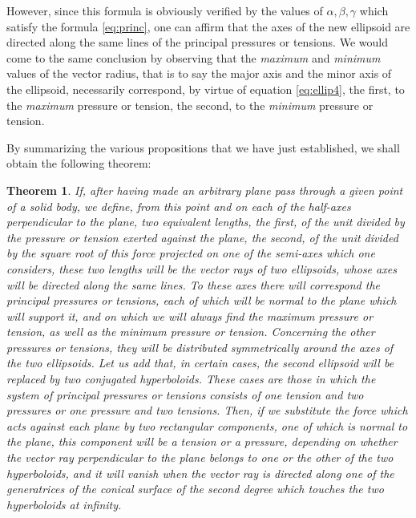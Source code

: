 \documentclass[leqno,openright,smallroyalvopaper,8pt,twoside,showtrims]{memoir}
\newtheorem{thm}{Theorem}
\begin{document}
\noindent However, since this formula is obviously verified by the values of $\alpha,\beta,\gamma$ which satisfy the formula \eqref{eq:princ}, one can affirm that the axes of the new ellipsoid are directed along the same lines of the principal pressures or tensions. We would come to the same conclusion by observing that the \emph{maximum} and \emph{minimum} values of the vector radius, that is to say the major axis and the minor axis of the ellipsoid, necessarily correspond, by virtue of equation \eqref{eq:ellip4}, the first, to the \emph{maximum} pressure or tension, the second, to the \emph{minimum} pressure or tension.

By summarizing the various propositions that we have just established, we shall obtain the following theorem:
\begin{thm}
If, after having made an arbitrary plane pass through a given point of a solid body, we define, from this point and on each of the half-axes perpendicular to the plane, two equivalent lengths, the first, of the unit divided by the pressure or tension exerted against the plane, the second, of the unit divided by the square root of this force projected on one of the semi-axes which one considers, these two lengths will be the vector rays of two ellipsoids, whose axes will be directed along the same lines. To these axes there will correspond the principal pressures or tensions, each of which will be normal to the plane which will support it, and on which we will always find the \emph{maximum} pressure or tension, as well as the \emph{minimum} pressure or tension. Concerning the other pressures or tensions, they will be distributed symmetrically around the axes of the two ellipsoids. Let us add that, in certain cases, the second ellipsoid will be replaced by two conjugated hyperboloids. These cases are those in which the system of principal pressures or tensions consists of one tension and two pressures or one pressure and two tensions. Then, if we substitute the force which acts against each plane by two rectangular components, one of which is normal to the plane, this component will be a tension or a pressure, depending on whether the vector ray perpendicular to the plane belongs to one or the other of the two hyperboloids,
and it will vanish when the vector ray is directed along one of the generatrices of the conical surface of the second degree which touches the two hyperboloids at infinity.
\end{thm} 
\end{document}
